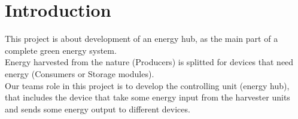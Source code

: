 
\chapter{Introduction}
	This project is about development of an energy hub, as the main part of a complete green energy system. 
	\\
	Energy harvested from the nature (Producers) is splitted  for devices that need energy (Consumers or Storage modules).
	\\
	Our teams role in this project is to develop the controlling unit (energy hub), that includes the device that take some energy input from the harvester units and sends some energy output to different devices.	
\newpage
